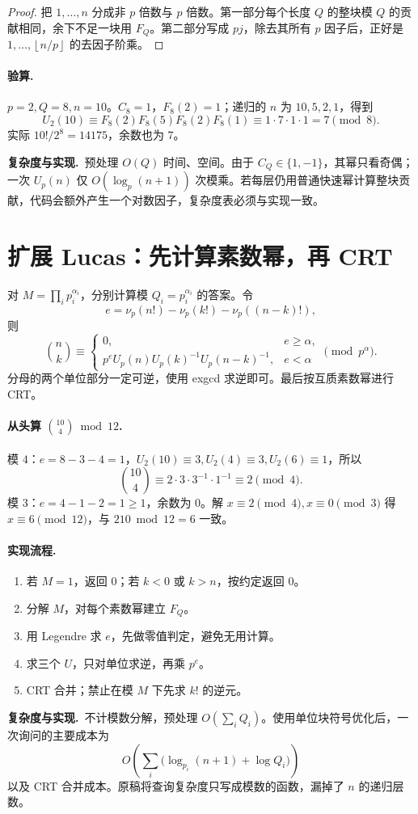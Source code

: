 \documentclass[UTF8,a4paper,11pt,oneside,openany,fontset=fandol]{ctexbook}
\theoremstyle{definition}
\newcommand{\floor}[1]{\left\lfloor #1\right\rfloor}
\newcommand{\cost}{\par\noindent\textbf{复杂度与实现.}\ }
\begin{document}
\begin{proof}
把 $1,\ldots,n$ 分成非 $p$ 倍数与 $p$ 倍数。第一部分每个长度 $Q$ 的整块模 $Q$ 的贡献相同，余下不足一块用 $F_Q$。第二部分写成 $pj$，除去其所有 $p$ 因子后，正好是 $1,\ldots,\floor{n/p}$ 的去因子阶乘。
\end{proof}
\paragraph{验算.} $p=2,Q=8,n=10$。$C_8=1$，$F_8(2)=1$；递归的 $n$ 为 $10,5,2,1$，得到
\[
 U_2(10)\equiv F_8(2)F_8(5)F_8(2)F_8(1)
 \equiv1\cdot7\cdot1\cdot1=7\pmod8.
\]
实际 $10!/2^8=14175$，余数也为 $7$。
\cost 预处理 $O(Q)$ 时间、空间。由于 $C_Q\in\{1,-1\}$，其幂只看奇偶；一次 $U_p(n)$ 仅 $O(\log_p(n+1))$ 次模乘。若每层仍用普通快速幂计算整块贡献，代码会额外产生一个对数因子，复杂度表必须与实现一致。


\section{扩展 Lucas：先计算素数幂，再 CRT}
对 $M=\prod_i p_i^{\alpha_i}$，分别计算模 $Q_i=p_i^{\alpha_i}$ 的答案。令
\[
 e=\nu_p(n!)-\nu_p(k!)-\nu_p((n-k)!),
\]
则
\[
\binom nk\equiv
\begin{cases}
0,&e\ge\alpha,\\
p^eU_p(n)U_p(k)^{-1}U_p(n-k)^{-1},&e<\alpha
\end{cases}\pmod{p^\alpha}.
\]
分母的两个单位部分一定可逆，使用 exgcd 求逆即可。最后按互质素数幂进行 CRT。


\paragraph{从头算 $\binom{10}{4}\bmod12$.}
模 $4$：$e=8-3-4=1$，$U_2(10)\equiv3,U_2(4)\equiv3,U_2(6)\equiv1$，所以
\[
 \binom{10}{4}\equiv2\cdot3\cdot3^{-1}\cdot1^{-1}\equiv2\pmod4.
\]
模 $3$：$e=4-1-2=1\ge1$，余数为 $0$。解 $x\equiv2\pmod4,x\equiv0\pmod3$ 得 $x\equiv6\pmod{12}$，与 $210\bmod12=6$ 一致。

\paragraph{实现流程.}
\begin{enumerate}
\item 若 $M=1$，返回 $0$；若 $k<0$ 或 $k>n$，按约定返回 $0$。
\item 分解 $M$，对每个素数幂建立 $F_Q$。
\item 用 Legendre 求 $e$，先做零值判定，避免无用计算。
\item 求三个 $U$，只对单位求逆，再乘 $p^e$。
\item CRT 合并；禁止在模 $M$ 下先求 $k!$ 的逆元。
\end{enumerate}
\cost 不计模数分解，预处理 $O(\sum_iQ_i)$。使用单位块符号优化后，一次询问的主要成本为
\[
O\!\left(\sum_i\bigl(\log_{p_i}(n+1)+\log Q_i\bigr)\right)
\]
以及 CRT 合并成本。原稿将查询复杂度只写成模数的函数，漏掉了 $n$ 的递归层数。
\end{document}
